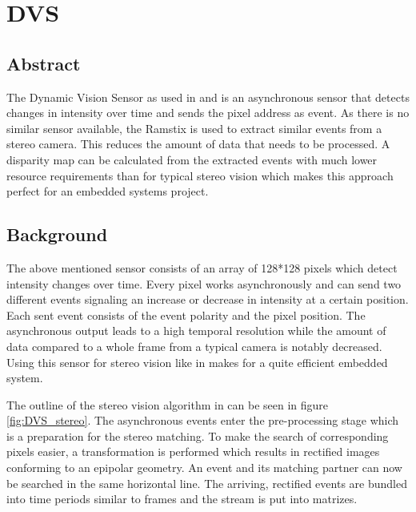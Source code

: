 \chapter{DVS} \label{ch:DVS}

\section{Abstract}
The Dynamic Vision Sensor as used in \citet{Belbachir01} and \citet{Belbachir02} is an asynchronous sensor that detects changes in intensity over time and sends the pixel address as event. As there is no similar sensor available, the Ramstix is used to extract similar events from a stereo camera. This reduces the amount of data that needs to be processed. A disparity map can be calculated from the extracted events with much lower resource requirements than for typical stereo vision which makes this approach perfect for an embedded systems project. 

\section{Background}
The above mentioned sensor consists of an array of 128*128 pixels which detect intensity changes over time. Every pixel works asynchronously and can send two different events signaling an increase or decrease in intensity at a certain position. Each sent event consists of the event polarity and the pixel position. The asynchronous output leads to a high temporal resolution while the amount of data compared to a whole frame from a typical camera is notably decreased. Using this sensor for stereo vision like in \citet{Belbachir01} makes for a quite efficient embedded system. 

The outline of the stereo vision algorithm in \citet{Belbachir01} can be seen in figure \ref{fig:DVS_stereo}. The asynchronous events enter the pre-processing stage which is a preparation for the stereo matching. To make the search of corresponding pixels easier, a transformation is performed which results in rectified images conforming to an epipolar geometry. An event and its matching partner can now be searched in the same horizontal line. The arriving, rectified events are bundled into time periods similar to frames and the stream is put into matrizes. 

